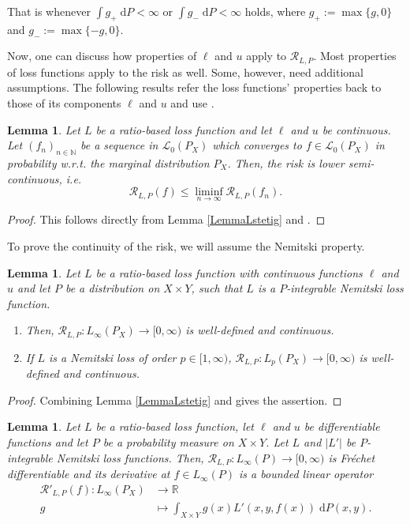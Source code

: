 \documentclass[10pt]{article}
\newcommand{\R}{\mathbb{R}}
\newcommand{\N}{\mathbb{N}}
\newcommand{\XY}{X \times Y}
\newcommand{\Lcal}{\mathcal{L}}
\newcommand{\RLP}{\mathcal{R}_{L,P}}
\newcommand{\dd}{\mathrm{d}}
\newtheorem{lemma}[theorem]{Lemma}
\begin{document}
That is whenever $\int g_+ \; \mathrm{d}P < \infty$ or $\int g_- \; \mathrm{d}P < \infty$ holds, where $g_+ := \max\{g, 0\}$ and $g_- := \max\{-g, 0\}$. \par 
Now, one can discuss how properties of $\ell$ and $u$ apply to $\RLP$.
Most properties of loss functions apply to the risk as well. 
Some, however, need additional assumptions.
The following results refer the loss functions' properties back to those of its components $\ell$ and $u$ and use \cite[Chapter 2.2]{SC08}.
\begin{lemma}
	Let $L$ be a ratio-based loss function and let $\ell$ and $u$ be continuous. 
	Let $(f_n)_{n \in \N}$ be a sequence in $\Lcal_0(P_X)$ which converges to $f \in \Lcal_0(P_X)$ in probability w.r.t. the marginal distribution $P_X$. 
	Then, the risk is lower semi-continuous, i.e. 
	\begin{equation*}
		\RLP(f) \leq \liminf_{n \to \infty} \RLP(f_n).
	\end{equation*}
\end{lemma}
\begin{proof}
	This follows directly from Lemma \ref{LemmaLstetig} and \cite[Lemma 2.15]{SC08}.
\end{proof}
To prove the continuity of the risk, we will assume the Nemitski property.
\begin{lemma}
	Let $L$ be a ratio-based loss function with continuous functions $\ell$ and $u$ and let $P$ be a distribution on $\XY$, such that $L$ is a $P$-integrable Nemitski loss function.
	\begin{enumerate}
		\item Then, $\RLP: L_\infty(P_X) \to [0, \infty)$ is well-defined and continuous.
		\item If $L$ is a Nemitski loss of order $p \in [1, \infty)$, $\RLP: L_p(P_X) \to [0, \infty)$ is well-defined and continuous.
	\end{enumerate}
\end{lemma}
\begin{proof}
	Combining Lemma \ref{LemmaLstetig} and \cite[Lemma 2.17]{SC08} gives the assertion.
\end{proof}
\begin{lemma}
	Let $L$ be a ratio-based loss function, let $\ell$ and $u$ be differentiable functions and let $P$ be a probability measure on $\XY$. 
	Let $L$ and $|L'|$ be $P$-integrable Nemitski loss functions.
	Then, $\RLP: L_\infty(P) \to [0, \infty)$ is Fr\'{e}chet differentiable and its derivative at $f \in L_\infty(P)$ is a bounded linear operator
	\begin{align*}
		\mathcal{R}'_{L,P}(f): L_\infty(P_X) &\to \R \\
		g &\mapsto \int_{\XY} g(x)L'(x,y,f(x)) \; \dd P(x,y).
	\end{align*}
\end{lemma}
\end{document}
